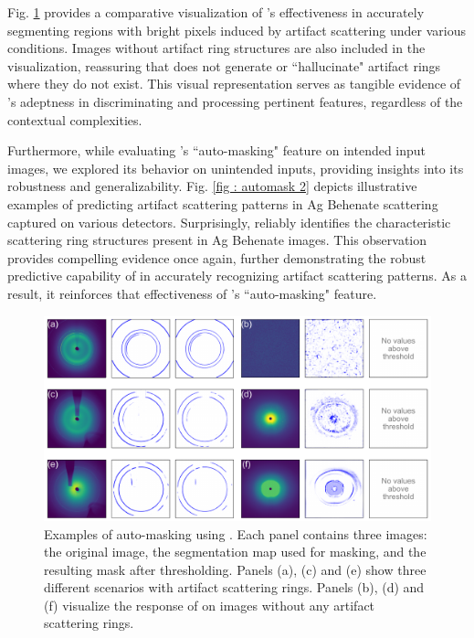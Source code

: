 \documentclass[a4paper]{article}
\begin{document}
Fig. \ref{fig : automask 1} provides a comparative visualization of \peaknet{}'s effectiveness in accurately segmenting regions with bright pixels induced by artifact scattering under various conditions.  Images without artifact ring structures are also included in the visualization, reassuring that \peaknet{} does not generate or ``hallucinate" artifact rings where they do not exist.  This visual representation serves as tangible evidence of \peaknet{} 's adeptness in discriminating and processing pertinent features, regardless of the contextual complexities.

Furthermore, while evaluating \peaknet{}'s ``auto-masking" feature on intended input images, we explored its behavior on unintended inputs, providing insights into its robustness and generalizability.  Fig. \ref{fig : automask 2} depicts illustrative examples of \peaknet{} predicting artifact scattering patterns in Ag Behenate scattering captured on various detectors.  Surprisingly, \peaknet{} reliably identifies the characteristic scattering ring structures present in Ag Behenate images.  This observation provides compelling evidence once again, further demonstrating the robust predictive capability of \peaknet{} in accurately recognizing artifact scattering patterns.  As a result, it reinforces that effectiveness of \peaknet{}'s ``auto-masking" feature.


\begin{figure}[!ht]
\includegraphics[width=\textwidth,keepaspectratio]
{./figures/automask.pdf} 
\caption{Examples of auto-masking using \peaknet{}.  Each panel contains three
images: the original image, the segmentation map used for masking, and the
resulting mask after thresholding.  Panels (a), (c) and (e) show three different
scenarios with artifact scattering rings.  Panels (b), (d) and (f) visualize the
response of \peaknet{} on images without any artifact scattering rings.}
\label{fig : automask 1} 
\end{figure}
\end{document}
